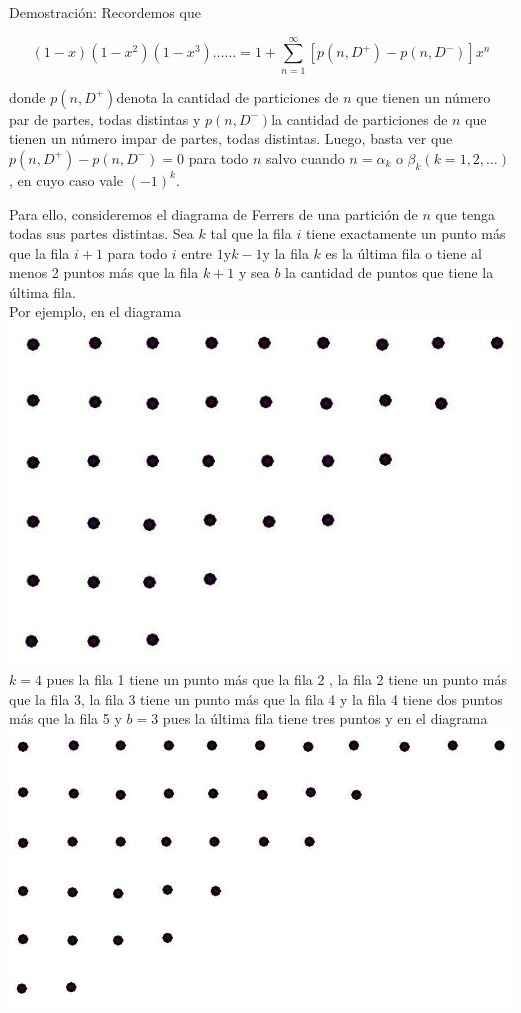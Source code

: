 \documentclass[10pt]{article}
\begin{document}
Demostración: Recordemos que

$$
(1-x)\left(1-x^{2}\right)\left(1-x^{3}\right) \ldots \ldots=1+\sum_{n=1}^{\infty}\left[p\left(n, D^{+}\right)-p\left(n, D^{-}\right)\right] x^{n}
$$

donde $p\left(n, D^{+}\right)$denota la cantidad de particiones de $n$ que tienen un número par de partes, todas distintas y $p\left(n, D^{-}\right)$la cantidad de particiones de $n$ que tienen un número impar de partes, todas distintas. Luego, basta ver que $p\left(n, D^{+}\right)-p\left(n, D^{-}\right)=0$ para todo $n$ salvo cuando $n=\alpha_{k}$ o $\beta_{k}(k=1,2, \ldots)$, en cuyo caso vale $(-1)^{k}$.

Para ello, consideremos el diagrama de Ferrers de una partición de $n$ que tenga todas sus partes distintas. Sea $k$ tal que la fila $i$ tiene exactamente un punto más que la fila $i+1$ para todo $i$ entre $1 \mathrm{y} k-1 \mathrm{y}$ la fila $k$ es la última fila o tiene al menos 2 puntos más que la fila $k+1$ y sea $b$ la cantidad de puntos que tiene la última fila.\\
Por ejemplo, en el diagrama\\
\includegraphics[max width=\textwidth, center]{2025_09_05_3ba26226ec0baddb5a03g-35}\\
$k=4$ pues la fila 1 tiene un punto más que la fila 2 , la fila 2 tiene un punto más que la fila 3, la fila 3 tiene un punto más que la fila 4 y la fila 4 tiene dos puntos más que la fila 5 y $b=3$ pues la última fila tiene tres puntos y en el diagrama\\
\includegraphics[max width=\textwidth, center]{2025_09_05_3ba26226ec0baddb5a03g-35(2)}\\
\end{document}
